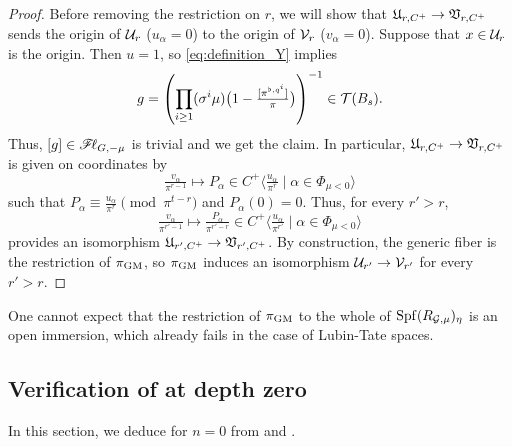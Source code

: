 \documentclass[12pt,reqno]{amsart}
\begin{document}
\begin{proof}
    Before removing the restriction on $r$, we will show that ${\mathfrak{U}}_{r, C^+} \to {\mathfrak{V}}_{r, C^+}$ sends the origin of ${\mathcal{U}}_r$ ($u_\alpha = 0$) to the origin of ${\mathcal{V}}_r$ ($v_\alpha = 0$). Suppose that $x \in {\mathcal{U}}_r$ is the origin. Then $u = 1$, so \eqref{eq:definition_Y} implies 
    \[
        g = \left( \prod_{i \geq 1} (\sigma^i\mu)\bigl(1 - \tfrac{[\pi^{\flat, q^{i}}]}{\pi}\bigr) \right)^{-1} \in {\mathcal{T}}(B_s). 
    \]
    Thus, $[g] \in {\mathscr{F}\!\ell}_{G, -\mu}$ is trivial and we get the claim. In particular, ${\mathfrak{U}}_{r, C^+} \to {\mathfrak{V}}_{r, C^+}$ is given on coordinates by 
    \[
        \tfrac{v_\alpha}{\pi^{r-1}} \mapsto P_\alpha \in C^+\langle \tfrac{u_\alpha}{\pi^r} \mid \alpha \in \Phi_{\mu < 0} \rangle
    \]
    such that $P_\alpha \equiv \tfrac{u_\alpha}{\pi^r} \pmod{\pi^{t-r}}$ and $P_\alpha(0) = 0$. Thus, for every $r' > r$, 
    \[
        \tfrac{v_\alpha}{\pi^{r' - 1}} \mapsto \tfrac{P_\alpha}{\pi^{r' - r}} \in C^+\langle \tfrac{u_\alpha}{\pi^{r'}} \mid \alpha \in \Phi_{\mu < 0} \rangle
    \]
    provides an isomorphism ${\mathfrak{U}}_{r', C^+} \to {\mathfrak{V}}_{r', C^+}$. By construction, the generic fiber is the restriction of $\pi_{\operatorname{GM}}$, so $\pi_{\operatorname{GM}}$ induces an isomorphism ${\mathcal{U}}_{r'} \to {\mathcal{V}}_{r'}$ for every $r' > r$. 
\end{proof}

\begin{rmk}
    One cannot expect that the restriction of $\pi_{\operatorname{GM}}$ to the whole of ${\operatorname{Spf}}(R_{{\mathcal{G}}, \mu})_\eta$ is an open immersion, which already fails in the case of Lubin-Tate spaces. 
\end{rmk}

\subsection{Verification of  at depth zero}

In this section, we deduce  for $n = 0$ from  and . 
\end{document}
